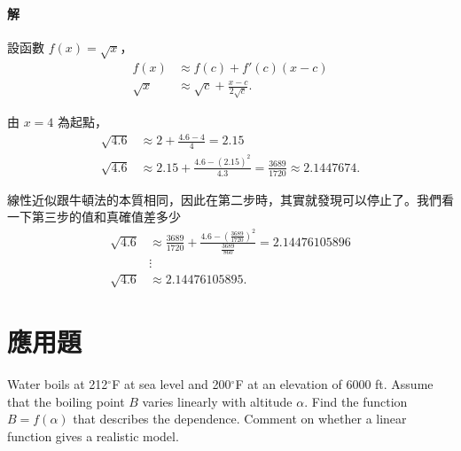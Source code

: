 \documentclass[a4paper,12pt]{article}
\begin{document}
\begin{CJK}{UTF8}{bsmi}
\paragraph{解}
設函數 $f(x) = \sqrt x$，
\begin{align*}
f(x) &\approx f(c) + f'(c)(x-c)\\
\sqrt x &\approx \sqrt c + \frac{x - c}{2 \sqrt c}.
\end{align*}

由 $x=4$ 為起點，
\begin{align*}
\sqrt{4.6} &\approx 2 + \frac{4.6 - 4}{4} = 2.15\\
\sqrt{4.6} &\approx 2.15 + \frac{4.6 - (2.15)^2}{4.3} = \frac{3689}{1720} \approx 2.1447674.
\end{align*}

線性近似跟牛頓法的本質相同，因此在第二步時，其實就發現可以停止了。我們看一下第三步的值和真確值差多少
\begin{align*}
\sqrt{4.6} &\approx \frac{3689}{1720} + \frac{4.6 - \left(\frac{3689}{1720}\right)^2}{\frac{3689}{860}} = 2.14476105896\\
&\vdots\\
\sqrt{4.6} &\approx 2.14476105895.
\end{align*}

\section{應用題}
Water boils at 212$^\circ$F at sea level and 200$^\circ$F at an elevation of 6000 ft. Assume that the boiling point $B$
varies linearly with altitude $\alpha$. Find the function $B = f(\alpha)$ that describes the dependence. Comment on whether
a linear function gives a realistic model.


\end{CJK}
\end{document}
